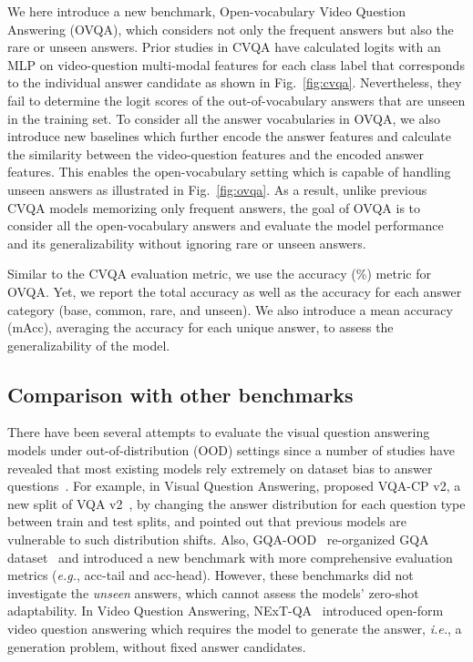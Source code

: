 \documentclass[10pt,twocolumn,letterpaper]{article}
\begin{document}
We here introduce a new benchmark, Open-vocabulary Video Question Answering (OVQA), which considers not only the frequent answers but also the rare or unseen answers.
Prior studies in CVQA have calculated logits with an MLP on video-question multi-modal features for each class label that corresponds to the individual answer candidate as shown in Fig.~\ref{fig:cvqa}.
Nevertheless, they fail to determine the logit scores of the out-of-vocabulary answers that are unseen in the training set.
To consider all the answer vocabularies in OVQA, we also introduce new baselines which further encode the answer features and calculate the similarity between the video-question features and the encoded answer features. 
This enables the open-vocabulary setting which is capable of handling unseen answers as illustrated in Fig.~\ref{fig:ovqa}.
As a result, unlike previous CVQA models memorizing only frequent answers, the goal of OVQA is to consider all the open-vocabulary answers and evaluate the model performance and its generalizability without ignoring rare or unseen answers.

Similar to the CVQA evaluation metric, we use the accuracy (\%) metric for OVQA.
Yet, we report the total accuracy as well as the accuracy for each answer category (base, common, rare, and unseen).
We also introduce a mean accuracy (mAcc), averaging the accuracy for each unique answer, to assess the generalizability of the model. \subsection{Comparison with other benchmarks}

There have been several attempts to evaluate the visual question answering models under out-of-distribution (OOD) settings since a number of studies have revealed that most existing models rely extremely on dataset bias to answer questions~\cite{agrawal2018don,kervadec2021roses,niu2021counterfactual, ramakrishnan2018overcoming, cadene2019rubi}.
For example, in Visual Question Answering, \cite{agrawal2018don} proposed VQA-CP v2, a new split of VQA v2~\cite{goyal2017making}, by changing the answer distribution for each question type between train and test splits, and pointed out that previous models are vulnerable to such distribution shifts.
Also, GQA-OOD~\cite{kervadec2021roses} re-organized GQA dataset~\cite{hudson2019gqa} and introduced a new benchmark with more comprehensive evaluation metrics (\textit{e.g.}, acc-tail and acc-head).
However, these benchmarks did not investigate the \textit{unseen} answers, which cannot assess the models’ zero-shot adaptability.
In Video Question Answering, NExT-QA~\cite{xiao2021next} introduced open-form video question answering which requires the model to generate the answer, \textit{i.e.}, a generation problem, without fixed answer candidates.
\end{document}
